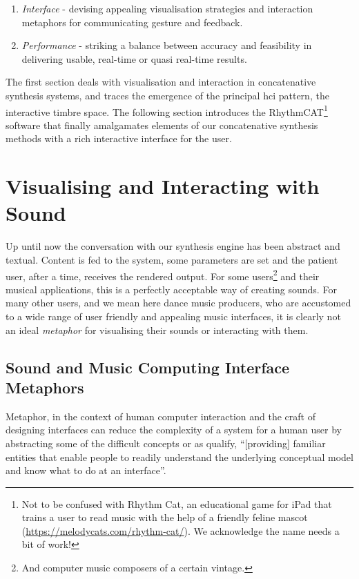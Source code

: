 \begin{enumerate}
  \item \textit{Interface} - devising appealing visualisation strategies and interaction metaphors for communicating gesture and feedback.
  \item \textit{Performance} - striking a balance between accuracy and feasibility in delivering usable, real-time or quasi real-time results. 
\end{enumerate}

The first section deals with visualisation and interaction in concatenative synthesis systems, and traces the emergence of the principal \acrshort{hci} pattern, the interactive timbre space. The following section introduces the RhythmCAT\footnote{Not to be confused with  Rhythm Cat, an educational game for iPad that trains a user to read music with the help of a friendly feline mascot (\url{https://melodycats.com/rhythm-cat/}). We acknowledge the name needs a bit of work!} software that finally amalgamates elements of our concatenative synthesis methods with a rich interactive interface for the user.

\section{Visualising and Interacting with Sound}

Up until now the conversation with our synthesis engine has been abstract and textual. Content is fed to the system, some parameters are set and the patient user, after a time, receives the rendered output. For some users\footnote{And computer music composers of a certain vintage.} and their musical applications, this is a perfectly acceptable way of creating sounds. For many other users, and we mean here dance music producers, who are accustomed to a wide range of user friendly and appealing music interfaces, it is clearly not an ideal \textit{metaphor} for visualising their sounds or interacting with them. 

\subsection{Sound and Music Computing Interface Metaphors}

Metaphor, in the context of human computer interaction and the craft of designing interfaces can reduce the complexity of a system for a human user by abstracting some of the difficult  concepts or as \cite{Rogers2011} qualify, ``[providing] familiar entities that enable people to readily understand the underlying conceptual model and know what to do at an interface''.

